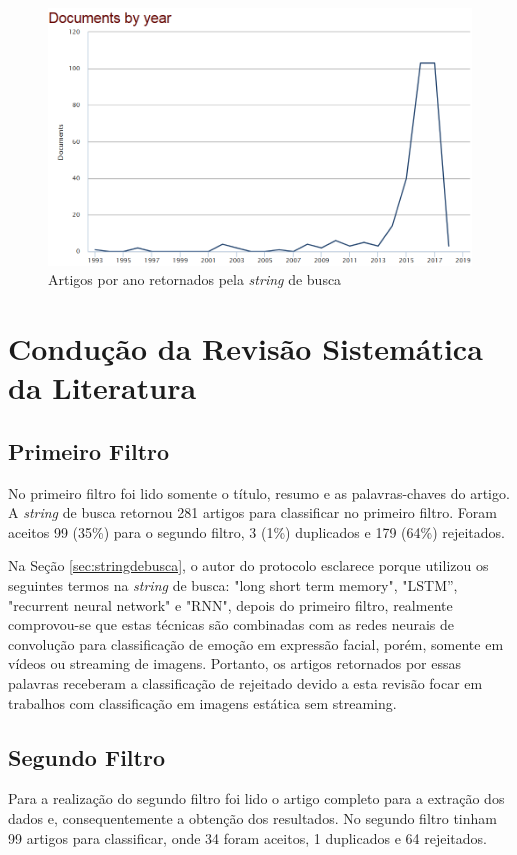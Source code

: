 \begin{figure}
\centering
\includegraphics[scale=0.45]{figuras/papersbyyear.png}
\caption{Artigos por ano retornados pela \textit{string} de busca}
\label{fig:papersbyyear}
\end{figure}

\section{Condução da Revisão Sistemática da Literatura}\label{sec:crsl}
\subsection{Primeiro Filtro}
No primeiro filtro foi lido somente o título, resumo e as palavras-chaves do artigo.
A \textit{string} de busca retornou 281 artigos para classificar no primeiro filtro. Foram aceitos 99 (35\%) para o segundo filtro, 3 (1\%) duplicados e 179 (64\%) rejeitados.

Na Seção \ref{sec:stringdebusca}, o autor do protocolo esclarece porque utilizou os seguintes termos na \textit{string} de busca: "long short term memory", "LSTM”, "recurrent neural network" e "RNN", depois do primeiro filtro, realmente comprovou-se que estas técnicas são combinadas com as redes neurais de convolução para classificação de emoção em expressão facial, porém, somente em vídeos ou streaming de imagens. Portanto, os artigos retornados por essas palavras receberam a classificação de rejeitado devido a esta revisão focar em trabalhos com classificação em imagens estática sem streaming. 

\subsection{Segundo Filtro}
Para a realização do segundo filtro foi lido o artigo completo para a extração dos dados e, consequentemente a obtenção dos resultados. No segundo filtro tinham 99 artigos para classificar, onde 34 foram aceitos, 1 duplicados e 64 rejeitados.

